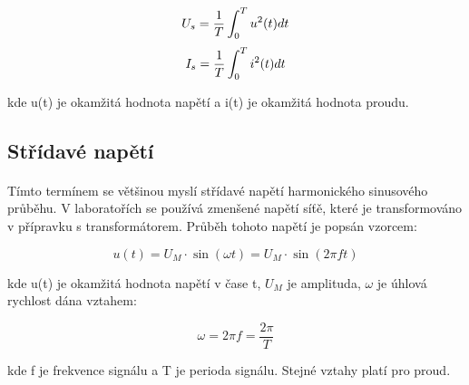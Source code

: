 \documentclass{praktikum}
\begin{document}
\begin{equation}
\label{eqn:u_meanval}
U_{s}=\frac{1}{T}\int_{0}^{T}u^2(t)dt\\
\end{equation}
\begin{equation}
\label{eqn:i_meanval}
I_{s}=\frac{1}{T}\int_{0}^{T}i^2(t)dt\\
\end{equation}

kde u(t) je okamžitá hodnota napětí a i(t) je okamžitá hodnota proudu.

\subsection{Střídavé napětí}
\paragraph{}
Tímto termínem se většinou myslí střídavé napětí harmonického sinusového průběhu. V laboratořích se používá zmenšené napětí síťě, které je transformováno v přípravku s transformátorem. Průběh tohoto napětí je popsán vzorcem:

\begin{equation}
\label{eqn:ut_stridave_harmonicke}
u(t)=U_M\cdot\sin(\omega t)=U_M \cdot \sin(2 \pi ft)
\end{equation}

kde u(t) je okamžitá hodnota napětí v čase t, $U_M$ je amplituda, $\omega$ je úhlová rychlost dána vztahem:

\begin{equation}
\label{eqn:omega_uhlova_rychlost}
\omega = 2 \pi f = \frac{2 \pi}{T}
\end{equation}

kde f je frekvence signálu a T je perioda signálu. Stejné vztahy platí pro proud.

\begin{center}
\end{center}
\end{document}
